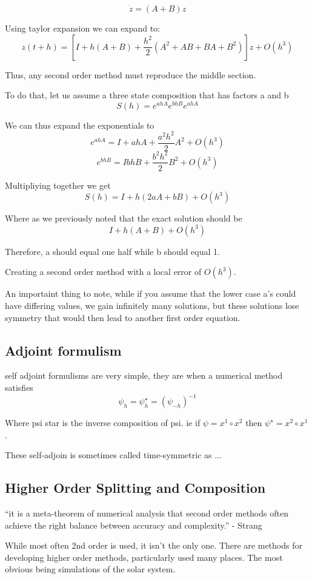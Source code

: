 \[
	\dot{z} = (A + B)z
\]

Using taylor expansion we can expand to:
\[
	z(t+h) = \left[I + h(A+B) + \frac{h^2}{2}(A^2 + AB + BA + B^2) \right]z + O(h^3)
\]

Thus, any second order method must reproduce the middle section.

To do that, let us assume a three state composition that has factors a and b
\[
	S(h)= e^{ahA}e^{bhB}e^{ahA}
\]

We can thus expand the exponentials to
\[
	e^{ahA} = I + ahA + \frac{a^2h^2}{2}A^2+O(h^3)
\]
\[
	e^{bhB} = I bhB + \frac{b^2h^2}{2}B^2+ O(h^3)
\]

Multipliying together we get
\[
	S(h) = I + h(2aA +bB) + O(h^3)
\]

Where as we previously noted that the exact solution should be
\[
	I + h(A+B)+ O(h^3)
\]

Therefore, a should equal one half while b should equal 1.

Creating a second order method with a local error of $O(h^3)$.

An importaint thing to note, while if you assume that the lower case a's could have differing values, we gain infinitely many solutions, but these solutions lose symmetry that would then lead to another first order equation.

\subsection{Adjoint formulism}
self adjoint formulisms are very simple, they are when a numerical method satisfies
\[
	\psi_h = \psi^{\star}_h = (\psi_{-h})^{-1}
\]

Where psi star is the inverse composition of psi. ie if $\psi = x^1 \circ x^2$ then $\psi^{\star} = x^2 \circ x^1$.

These self-adjoin is sometimes called time-symmetric as ...
\subsection{Higher Order Splitting and Composition}
``it is a meta-theorem of numerical analysis that second order methods often achieve the right balance between accuracy and complexity.'' - Strang

While most often 2nd order is used, it isn't the only one. There are methods for developing higher order methods, particularly used many places. The most obvious being simulations of the solar system.

